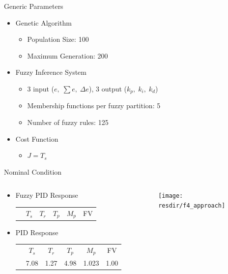 \documentclass[]{beamer}
\newcommand{\resdir}{../results}
\begin{document}
\begin{frame}{Generic Parameters}
    \begin{itemize}
        \item Genetic Algorithm
            \begin{itemize}
                \item Population Size: 100
                \item Maximum Generation: 200
            \end{itemize}
        \item Fuzzy Inference System
            \begin{itemize}
                \item 3 input ($e,\;\sum e,\;\Delta e$), 3 output ($k_p,\;k_i,\;k_d$)
                \item Membership functions per fuzzy partition: 5
                \item Number of fuzzy rules: 125
            \end{itemize}
        \item Cost Function
            \begin{itemize}
                \item $ J = T_s$
            \end{itemize}
    \end{itemize}
\end{frame}

\begin{frame}{Nominal Condition}
    \begin{columns}
        \begin{column}{0.5\textwidth}
            \vspace{-3.25cm}
            \begin{itemize}
                \item Fuzzy PID Response
                    \begin{tabular}{cccccc}
                        &$T_s$ & $T_r$ & $T_p$ & $M_p$ & FV\\\cline{2-6}
                        
                    \end{tabular}
                \item PID Response
                    \begin{tabular}{cccccc}
                        &$T_s$ & $T_r$ & $T_p$ & $M_p$ & FV\\\cline{2-6}
                        & 7.08      & 1.27      & 4.98      & 1.023       & 1.00 
                    \end{tabular}
            \end{itemize}
        \end{column}
        \begin{column}{0.5\textwidth}
            \centering
            \vspace{3.25cm}
            \texttt{[image: \\resdir/f4\_approach]}
        \end{column}
    \end{columns}
\end{frame}
\end{document}
